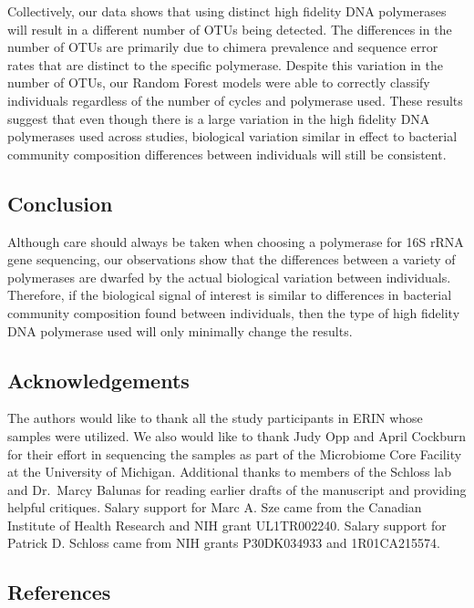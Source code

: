 \documentclass[11pt,]{article}
\begin{document}
Collectively, our data shows that using distinct high fidelity DNA
polymerases will result in a different number of OTUs being detected.
The differences in the number of OTUs are primarily due to chimera
prevalence and sequence error rates that are distinct to the specific
polymerase. Despite this variation in the number of OTUs, our Random
Forest models were able to correctly classify individuals regardless of
the number of cycles and polymerase used. These results suggest that
even though there is a large variation in the high fidelity DNA
polymerases used across studies, biological variation similar in effect
to bacterial community composition differences between individuals will
still be consistent.

\newpage

\subsection{Conclusion}\label{conclusion}

Although care should always be taken when choosing a polymerase for 16S
rRNA gene sequencing, our observations show that the differences between
a variety of polymerases are dwarfed by the actual biological variation
between individuals. Therefore, if the biological signal of interest is
similar to differences in bacterial community composition found between
individuals, then the type of high fidelity DNA polymerase used will
only minimally change the results.

\newpage

\subsection{Acknowledgements}\label{acknowledgements}

The authors would like to thank all the study participants in ERIN whose
samples were utilized. We also would like to thank Judy Opp and April
Cockburn for their effort in sequencing the samples as part of the
Microbiome Core Facility at the University of Michigan. Additional
thanks to members of the Schloss lab and Dr.~Marcy Balunas for reading
earlier drafts of the manuscript and providing helpful critiques. Salary
support for Marc A. Sze came from the Canadian Institute of Health
Research and NIH grant UL1TR002240. Salary support for Patrick D.
Schloss came from NIH grants P30DK034933 and 1R01CA215574.

\newpage

\subsection{References}\label{references}
\end{document}

